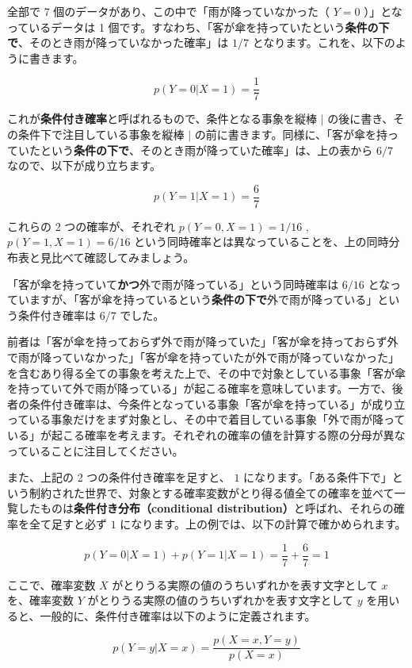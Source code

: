 全部で 7 個のデータがあり、この中で「雨が降っていなかった（ $Y = 0$ ）」となっているデータは 1 個です。すなわち、「客が傘を持っていたという\textbf{条件の下で}、そのとき雨が降っていなかった確率」は $1 / 7$ となります。これを、以下のように書きます。


\[
p(Y = 0 | X = 1) = \frac{1}{7}
\]


これが\textbf{条件付き確率}と呼ばれるもので、条件となる事象を縦棒 $|$ の後に書き、その条件下で注目している事象を縦棒 $|$ の前に書きます。同様に、「客が傘を持っていたという\textbf{条件の下で}、そのとき雨が降っていた確率」は、上の表から $6 / 7$ なので、以下が成り立ちます。


\[
p(Y = 1 | X = 1) = \frac{6}{7}
\]


これらの 2 つの確率が、それぞれ $p(Y = 0, X = 1) = 1 / 16$ , $p(Y = 1, X = 1) = 6 / 16$ という同時確率とは異なっていることを、上の同時分布表と見比べて確認してみましょう。

「客が傘を持っていて\textbf{かつ}外で雨が降っている」という同時確率は $6 / 16$ となっていますが、「客が傘を持っているという\textbf{条件の下で}外で雨が降っている」という条件付き確率は $6 / 7$ でした。

前者は「客が傘を持っておらず外で雨が降っていた」「客が傘を持っておらず外で雨が降っていなかった」「客が傘を持っていたが外で雨が降っていなかった」を含むあり得る全ての事象を考えた上で、その中で対象としている事象「客が傘を持っていて外で雨が降っている」が起こる確率を意味しています。一方で、後者の条件付き確率は、今条件となっている事象「客が傘を持っている」が成り立っている事象だけをまず対象とし、その中で着目している事象「外で雨が降っている」が起こる確率を考えます。それぞれの確率の値を計算する際の分母が異なっていることに注目してください。


また、上記の 2 つの条件付き確率を足すと、 $1$ になります。「ある条件下で」という制約された世界で、対象とする確率変数がとり得る値全ての確率を並べて一覧したものは\textbf{条件付き分布（conditional distribution）}と呼ばれ、それらの確率を全て足すと必ず $1$ になります。上の例では、以下の計算で確かめられます。


\[
p(Y = 0 | X = 1) + p(Y = 1 | X = 1) = \frac{1}{7} + \frac{6}{7} = 1
\]


ここで、確率変数 $X$ がとりうる実際の値のうちいずれかを表す文字として $x$ を、確率変数 $Y$ がとりうる実際の値のうちいずれかを表す文字として $y$ を用いると、一般的に、条件付き確率は以下のように定義されます。


\[
p(Y = y | X = x)
= \frac{p(X = x, Y = y)}{p(X = x)}
\]


